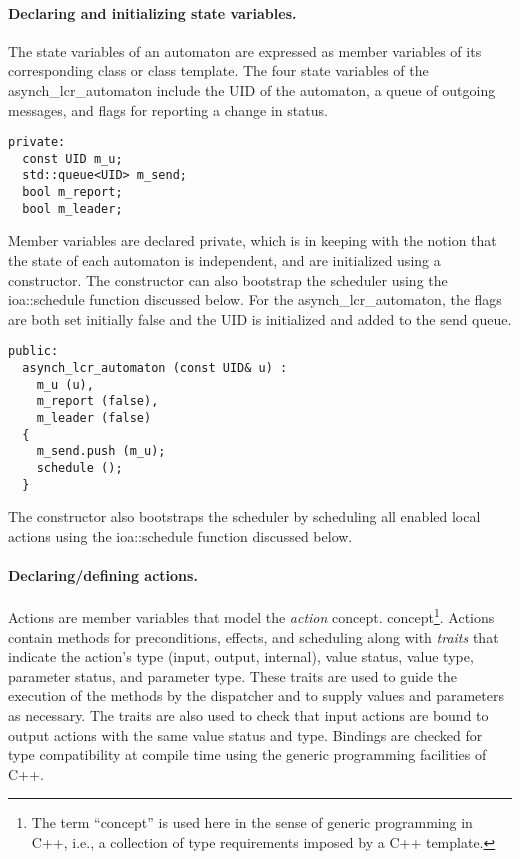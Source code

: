 \paragraph*{Declaring and initializing state variables.}
\fi
The state variables of an automaton are expressed as member variables of its corresponding class or class template.
\ifjournal
The four state variables of the asynch\_lcr\_automaton include the UID of the automaton, a queue of outgoing messages, and flags for reporting a change in status.
\begin{lstlisting}
private:
  const UID m_u;
  std::queue<UID> m_send;
  bool m_report;
  bool m_leader;
\end{lstlisting}
\fi
Member variables are declared private, which is in keeping with the notion that the state of each automaton is independent, and are initialized using a constructor.
The constructor can also bootstrap the scheduler using the ioa::schedule function discussed below.
\ifjournal
For the asynch\_lcr\_automaton, the flags are both set initially false and the UID is initialized and added to the send queue.
\begin{lstlisting}
public:
  asynch_lcr_automaton (const UID& u) :
    m_u (u),
    m_report (false),
    m_leader (false)
  {
    m_send.push (m_u);
    schedule ();
  }
\end{lstlisting}
The constructor also bootstraps the scheduler by scheduling all enabled local actions using the ioa::schedule function discussed below.
\fi

\paragraph*{Declaring/defining actions.}
Actions are member variables that model the \emph{action} 
\ifjournal
concept.
\else
concept\footnote{The term ``concept'' is used here in the sense of generic programming in C++, i.e., a collection of type requirements imposed by a C++ template.}.
\fi
Actions contain methods for preconditions, effects, and scheduling along with \emph{traits} that indicate the action's type (input, output, internal), value status, value type, parameter status, and parameter type.
These traits are used to guide the execution of the methods by the dispatcher and to supply values and parameters as necessary.
The traits are also used to check that input actions are bound to output actions with the same value status and type.
Bindings are checked for type compatibility at compile time using the generic programming facilities of C++.

